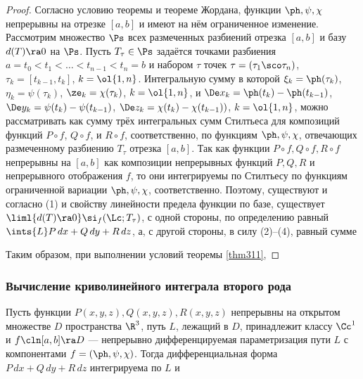 \documentclass[a4paper]{article}
\begin{document}
\begin{proof}
Согласно условию теоремы и теореме Жордана, функции $\ph,\psi,\chi$
непрерывны на отрезке $[a,b]$ и имеют на нём ограниченное изменение.
Рассмотрим множество $\Ps$ всех размеченных разбиений отрезка
$[a,b]$ и базу $d(T)\ra0$ на $\Ps$. Пусть $T_{\tau}\in\Ps$ задаётся
точками разбиения $a=t_0<t_1<\ldots<t_{n-1}<t_n=b$ и набором $\tau$
точек $\tau=(\tau_1\sco\tau_n)$, $\tau_k=[t_{k-1},t_k]$,
$k=\ol{1,n}$. Интегральную сумму  в которой $\xi_k=\ph(\tau_k)$,
$\eta_k=\psi(\tau_k)$, $\ze_k=\chi(\tau_k)$, $k=\ol{1,n}$, и $\De
x_k=\ph(t_k)-\ph(t_{k-1})$, $\De y_k = \psi(t_k)-\psi(t_{k-1})$,
$\De z_k= \chi(t_k) - \chi(t_{k-1}))$, $k=\ol{1,n}$, можно
рассматривать как сумму трёх интегральных сумм Стилтьеса для
композиций функций $P\circ f$, $Q\circ f$, и $R\circ f$,
соответственно, по функциям $\ph,\psi,\chi$, отвечающих размеченному
разбиению $T_{\tau}$ отрезка $[a,b]$. Так как функции $P\circ
f,Q\circ f,R\circ f$ непрерывны на $[a,b]$ как композиции
непрерывных функций $P,Q,R$ и непрерывного отображения $f$, то они
интегрируемы по Стилтьесу по функциям ограниченной вариации
$\ph,\psi,\chi$, соответственно. Поэтому, существуют
 
 и согласно (1) и свойству
линейности предела функции по базе, существует $\liml{d(T)\ra0}
\si_f(\Lc;T_{\tau})$, с одной стороны, по определению равный
$\ints{L}P\,dx+Q\,dy+R\,dz$, а, с другой стороны, в силу (2)--(4),
равный сумме 

Таким образом, при выполнении условий теоремы \ref{thm311},
\end{proof}

\subsubsection{Вычисление криволинейного интеграла второго рода}

\begin{theorem}
\label{thm322} Пусть функции $P(x,y,z),Q(x,y,z),R(x,y,z)$ непрерывны
на открытом множестве $D$ пространства $\R^3$, путь $L$, лежащий в
$D$, принадлежит классу $\Cc^1$ и $f\cln[a,b]\ra D$ --- непрерывно
дифференцируемая параметризация пути $L$ с компонентами
$f=(\ph,\psi,\chi)$. Тогда дифференциальная форма
$P\,dx+Q\,dy+R\,dz$ интегрируема по $L$ и
\end{theorem}
\end{document}
